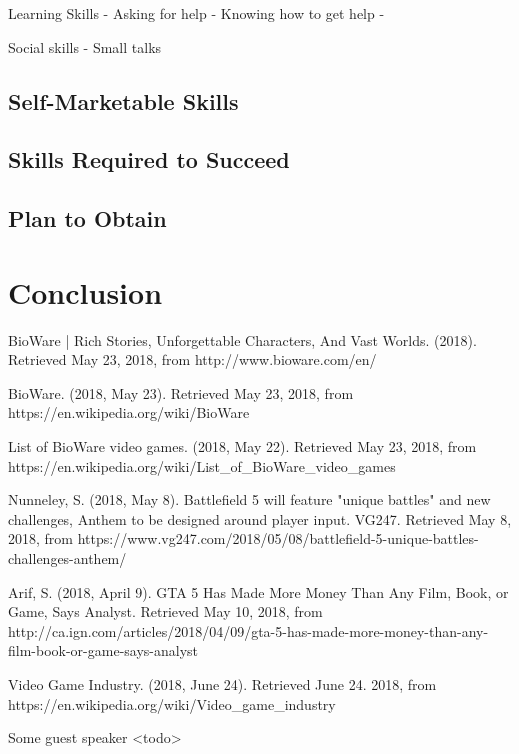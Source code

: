 \documentclass[10pt,letterpaper]{article}
\begin{document}
Learning Skills
- Asking for help
- Knowing how to get help
-

Social skills
- Small talks

\subsection{Self-Marketable Skills}

\subsection{Skills Required to Succeed}

\subsection{Plan to Obtain}

\section*{Conclusion}\label{conclusion}

\begin{thebibliography}{}

	BioWare | Rich Stories, Unforgettable Characters, And Vast Worlds. (2018). Retrieved May 23, 2018, from http://www.bioware.com/en/

	BioWare. (2018, May 23). Retrieved May 23, 2018, from https://en.wikipedia.org/wiki/BioWare

	List of BioWare video games. (2018, May 22). Retrieved May 23, 2018, from https://en.wikipedia.org/wiki/List\_of\_BioWare\_video\_games

	Nunneley, S. (2018, May 8). Battlefield 5 will feature "unique battles" and new challenges, Anthem to be designed around player input. VG247. Retrieved May 8, 2018, from https://www.vg247.com/2018/05/08/battlefield-5-unique-battles-challenges-anthem/

	Arif, S. (2018, April 9). GTA 5 Has Made More Money Than Any Film, Book, or Game, Says Analyst. Retrieved May 10, 2018, from http://ca.ign.com/articles/2018/04/09/gta-5-has-made-more-money-than-any-film-book-or-game-says-analyst

	Video Game Industry. (2018, June 24). Retrieved June 24. 2018, from https://en.wikipedia.org/wiki/Video\_game\_industry

	Some guest speaker <todo>

\end{thebibliography}
\end{document}
